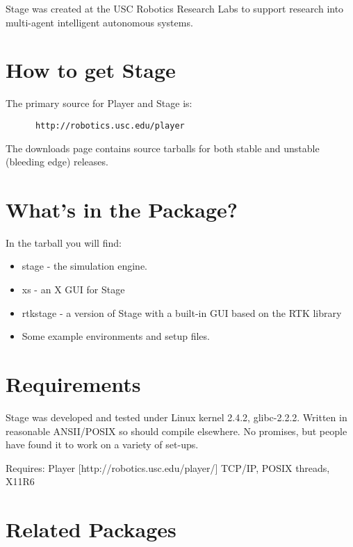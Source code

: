 \documentclass[11pt]{report}
\begin{document}
    Stage was created at the USC Robotics Research Labs to support
    research into multi-agent intelligent autonomous systems.

  \section{How to get Stage}

    The primary source for Player and Stage is:
      \begin{verbatim}
      http://robotics.usc.edu/player
      \end{verbatim}
    The downloads page contains source tarballs for both
    stable and unstable (bleeding edge) releases.

  \section{What's in the Package?}

    In the tarball you will find:
      \begin{itemize}    
      \item stage    - the simulation engine.
      \item xs       - an X GUI for Stage
      \item rtkstage - a version of Stage with a built-in GUI based on the RTK library
      \item Some example environments and setup files.
      \end{itemize}

  \section{Requirements}

    Stage was developed and tested under Linux kernel 2.4.2,
    glibc-2.2.2.  Written in reasonable ANSII/POSIX so should compile
    elsewhere. No promises, but people have found it to work on a
    variety of set-ups.

    Requires: Player [http://robotics.usc.edu/player/]
              TCP/IP, POSIX threads, X11R6
  
  \section{Related Packages}
\end{document}
